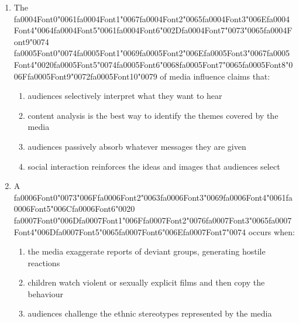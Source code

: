 \documentclass[12pt]{article}
\begin{document}
\begin{enumerate}[label=\arabic*.]
\begin{enumerate}[label=(\alph*)]
\end{enumerate}
\item The {\csname fa0004Font0\endcsname\char"0061}{\csname fa0004Font1\endcsname\char"0067}{\csname fa0004Font2\endcsname\char"0065}{\csname fa0004Font3\endcsname\char"006E}{\csname fa0004Font4\endcsname\char"0064}{\csname fa0004Font5\endcsname\char"0061}{\csname fa0004Font6\endcsname\char"002D}{\csname fa0004Font7\endcsname\char"0073}{\char"0065}{\csname fa0004Font9\endcsname\char"0074} {\csname fa0005Font0\endcsname\char"0074}{\csname fa0005Font1\endcsname\char"0069}{\csname fa0005Font2\endcsname\char"006E}{\csname fa0005Font3\endcsname\char"0067}{\csname fa0005Font4\endcsname\char"0020}{\csname fa0005Font5\endcsname\char"0074}{\csname fa0005Font6\endcsname\char"0068}{\csname fa0005Font7\endcsname\char"0065}{\csname fa0005Font8\endcsname\char"006F}{\csname fa0005Font9\endcsname\char"0072}{\csname fa0005Font10\endcsname\char"0079} of media influence claims that:
\begin{enumerate}[label=(\alph*)]
    \item audiences selectively interpret what they want to hear
    \item content analysis is the best way to identify the themes covered by the media
    \item audiences passively absorb whatever messages they are given
    \item social interaction reinforces the ideas and images that audiences select
\end{enumerate}
\item A {\csname fa0006Font0\endcsname\char"0073}{\char"006F}{\csname fa0006Font2\endcsname\char"0063}{\csname fa0006Font3\endcsname\char"0069}{\csname fa0006Font4\endcsname\char"0061}{\csname fa0006Font5\endcsname\char"006C}{\csname fa0006Font6\endcsname\char"0020} {\csname fa0007Font0\endcsname\char"006D}{\csname fa0007Font1\endcsname\char"006F}{\csname fa0007Font2\endcsname\char"0076}{\csname fa0007Font3\endcsname\char"0065}{\csname fa0007Font4\endcsname\char"006D}{\csname fa0007Font5\endcsname\char"0065}{\csname fa0007Font6\endcsname\char"006E}{\csname fa0007Font7\endcsname\char"0074} occurs when:
\begin{enumerate}[label=(\alph*)]
    \item the media exaggerate reports of deviant groups, generating hostile reactions
    \item children watch violent or sexually explicit films and then copy the behaviour
    \item audiences challenge the ethnic stereotypes represented by the media

\end{enumerate}
\end{enumerate}
\end{document}
